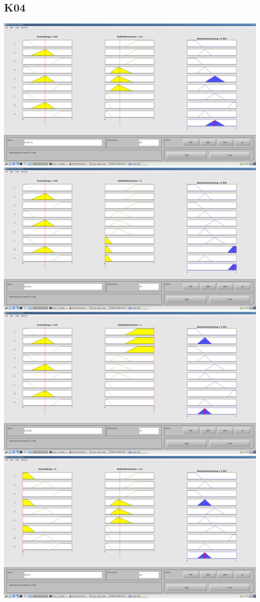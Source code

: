 \subsection*{K04}
\includegraphics[width=\textwidth]{part/screenshots/fuzzy-17c-K04-0,45-0,3}
\includegraphics[width=\textwidth]{part/screenshots/fuzzy-17c-K04-0,45-0}
\includegraphics[width=\textwidth]{part/screenshots/fuzzy-17c-K04-0,45-1}
\includegraphics[width=\textwidth]{part/screenshots/fuzzy-17c-K04-0-0,3}
